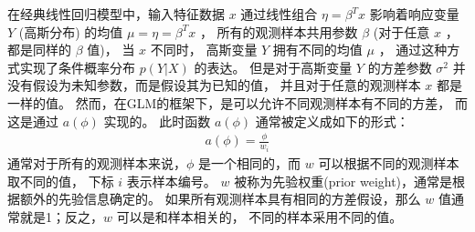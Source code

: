 \documentclass[letterpaper,10pt,english]{sphinxmanual}
\begin{document}
在经典线性回归模型中，输入特征数据 \(x\) 通过线性组合 \(\eta=\beta^T x\)
影响着响应变量 \(Y\) (高斯分布) 的均值 \(\mu=\eta=\beta^T x\) ，
所有的观测样本共用参数 \(\beta\) (对于任意 \(x\) ，都是同样的 \(\beta\) 值)，
当 \(x\) 不同时， 高斯变量 \(Y\) 拥有不同的均值 \(\mu\) ，
通过这种方式实现了条件概率分布 \(p(Y|X)\) 的表达。
但是对于高斯变量 \(Y\) 的方差参数 \(\sigma^2\) 并没有假设为未知参数，而是假设其为已知的值，
并且对于任意的观测样本 \(x\) 都是一样的值。
然而，在GLM的框架下，是可以允许不同观测样本有不同的方差，
而这是通过 \(a(\phi)\) 实现的。
此时函数 \(a(\phi)\) 通常被定义成如下的形式：
\begin{equation}\label{equation:广义线性模型/content:广义线性模型/content:8}
\begin{split}a(\phi) = \frac{\phi}{w_i}\end{split}
\end{equation}
通常对于所有的观测样本来说，\(\phi\) 是一个相同的，而 \(w\) 可以根据不同的观测样本取不同的值，
下标 \(i\) 表示样本编号。
\(w\) 被称为先验权重(prior weight)，通常是根据额外的先验信息确定的。
如果所有观测样本具有相同的方差假设，那么 \(w\) 值通常就是1；反之，\(w\) 可以是和样本相关的，
不同的样本采用不同的值。
\end{document}
